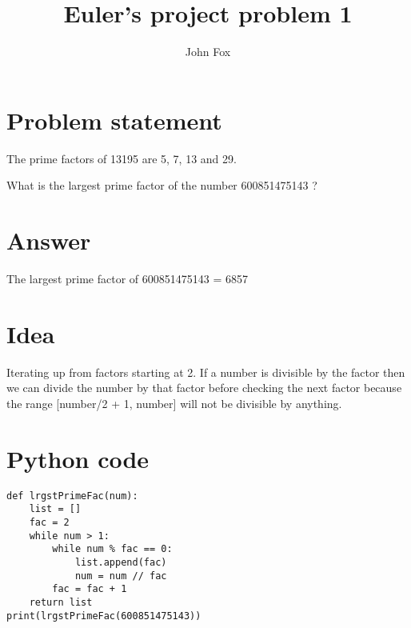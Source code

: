 \documentclass{article}
\title{Euler's project problem 1}
\author{John Fox}
\begin{document}
\maketitle


\section*{Problem statement} 
The prime factors of 13195 are 5, 7, 13 and 29.

What is the largest prime factor of the number 600851475143 ?

\section*{Answer}
The largest prime factor of 600851475143 = 6857
\section*{Idea} Iterating up from factors starting at 2. If a number is divisible by the factor then we can divide the number by that factor before checking the next factor because the range [number/2 + 1, number] will not be divisible by anything. 

\section*{Python code}
\begin{verbatim}
def lrgstPrimeFac(num):
    list = []
    fac = 2
    while num > 1:
        while num % fac == 0:
            list.append(fac)
            num = num // fac
        fac = fac + 1
    return list
print(lrgstPrimeFac(600851475143))
\end{verbatim}
\end{document}
